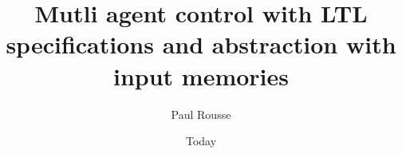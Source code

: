 \documentclass[electronic]{kthesis}
\newcommand{\vect}[1]{\ensuremath{ \mathbf{#1}}}
\theoremstyle{named}
\begin{document}
\title{Mutli agent control with LTL specifications and abstraction with input memories}
\subtitle{}
\author{Paul Rousse}
\date{Today}
\imprint{}
\disputationsdatum{}
\disputationslokal{}
\publisher{}
\examen{}

\frontmatter

\maketitle

\tableofcontents

\mainmatter 



\newcommand{\SSunobs}{\mathfrak{X}^i}
\newcommand{\SSobs}{\mathfrak{X}^o}
\newcommand{\Ninputs}{\Delta n_u}%
\newcommand{\y}{\vect{y}}%
\newcommand{\x}{\vect{x}}%
\newcommand{\xa}{\vect{x}^a}%
\newcommand{\xobs}{\vect{x}^o}%
\newcommand{\Xobs}{X^o}%
\newcommand{\Xobsinit}{X^o_0}%
\newcommand{\xunobs}{\vect{x}^i}%
\newcommand{\Xunobs}{X^i}%
\newcommand{\Sunobs}{\mathcal{S}^i}%
\newcommand{\Xuinv}{{\mathcal{X}^i}}%
\newcommand{\pastuseq}{\vect{u}_{n-\Ninputs},\dots,\vect{u}_{n-1}}%
\newcommand{\pastuseqn}{\vect{u}_{n+1-\Ninputs},\dots,\vect{u}_{n}}%
\newcommand{\Pastuseq}{U_n}%
\newcommand{\sys}{\mathcal{S}}%
\newcommand{\sysa}{\mathcal{S}_a}%
\newcommand{\sysaU}{\mathcal{U}}%
\newcommand{\sysA}{\mathcal{S}_A}%
\newcommand{\sysB}{\mathcal{S}_B}%
\newcommand{\sysC}{\mathcal{S}_C}%
\newcommand{\Usys}{\mathcal{U}}%
\newcommand{\Wsys}{\mathcal{W}}%
\newcommand{\Uunobs}{{\mathcal{U}^i}}%
\newcommand{\Wunobs}{{\mathcal{W}^i}}%
\newcommand{\uobs}{\vect{u}^o}%
\newcommand{\wobs}{\vect{w}^o}%
\newcommand{\uunobs}{\vect{u}^i}%
\newcommand{\wunobs}{\vect{w}^i}%
\newcommand{\Dunobs}{n^i}%
\newcommand{\R}{\mathbb{R}}%
\newcommand{\mle}{\prec}
\newcommand{\mleq}{\preceq}
\newcommand{\minf}[1]{\underline{#1}}
\newcommand{\msup}[1]{\overline{#1}}
\newcommand{\X}{X}%
\newcommand{\Xinv}{\mathcal{X}}%
\newcommand{\U}{\mathcal{U}}%
\newcommand{\W}{\mathcal{W}}%
\newcommand{\vu}{\vect{u}}%
\renewcommand{\u}{\vect{u}}%
\renewcommand{\U}{\mathcal{U}}%
\newcommand{\w}{\vect{w}}%
\newcommand{\s}{\vect{s}}%
\newcommand{\st}{\vect{t}}%
%
\newcommand{\traj}{\varphi}
%
\newcommand{\xd}{\x_d}
\newcommand{\vd}{\vect{v}_d}
\newcommand{\Nobs}{N^o} %
%

\end{document}
